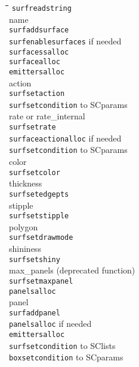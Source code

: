 \documentclass {book}
\begin{document}
\begin{tabbing}
\hspace{0.25in}\=\hspace{0.25in}\=\hspace{0.25in}\=\hspace{0.25in}\=\hspace{0.25in}\=\hspace{0.25in}\=\kill
\texttt{surfreadstring}\\
\>name\\
\>\>\texttt{surfaddsurface}\\
\>\>\>\texttt{surfenablesurfaces} if needed\\
\>\>\>\>\texttt{surfacessalloc}\\
\>\>\>\>\>\texttt{surfacealloc}\\
\>\>\>\>\>\>\texttt{emittersalloc}\\
\>action\\
\>\>\texttt{surfsetaction}\\
\>\>\>\texttt{surfsetcondition} to SCparams\\
\>rate or rate\_internal\\
\>\>\texttt{surfsetrate}\\
\>\>\>\texttt{surfaceactionalloc} if needed\\
\>\>\>\texttt{surfsetcondition} to SCparams\\
\>color\\
\>\>\texttt{surfsetcolor}\\
\>thickness\\
\>\>\texttt{surfsetedgepts}\\
\>stipple\\
\>\>\texttt{surfsetstipple}\\
\>polygon\\
\>\>\texttt{surfsetdrawmode}\\
\>shininess\\
\>\>\texttt{surfsetshiny}\\
\>max\_panels (deprecated function)\\
\>\>\texttt{surfsetmaxpanel}\\
\>\>\>\texttt{panelsalloc}\\
\>panel\\
\>\>\texttt{surfaddpanel}\\
\>\>\>\texttt{panelsalloc} if needed\\
\>\>\>\>\texttt{emittersalloc}\\
\>\>\>\texttt{surfsetcondition} to SClists\\
\>\>\>\texttt{boxsetcondition} to SCparams\\

\end{tabbing}
\end{document}
